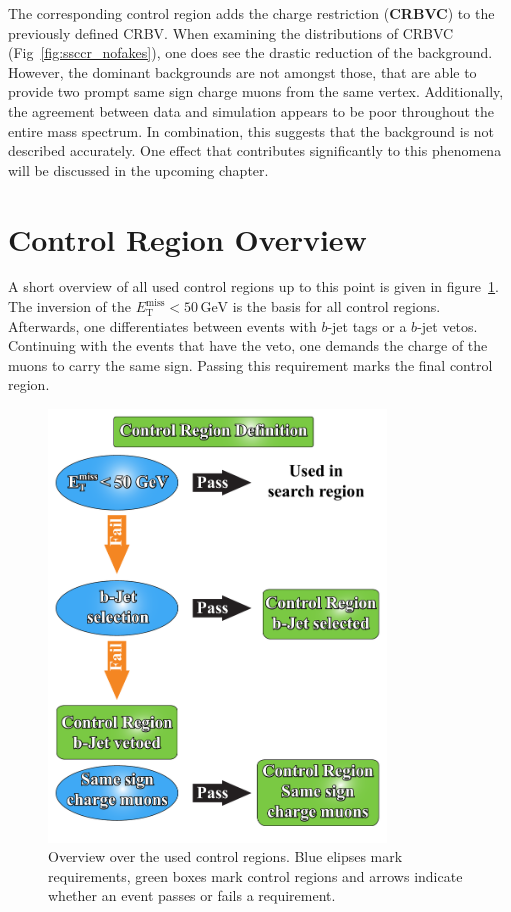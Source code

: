 The corresponding control region adds the charge restriction (\textbf{CRBVC}) to the previously defined CRBV. When examining the distributions of CRBVC (Fig~\ref{fig:ssccr_nofakes}), one does see the drastic reduction of the background. However, the dominant backgrounds are not amongst those, that are able to provide two prompt same sign charge muons from the same vertex. Additionally, the agreement between data and simulation appears to be poor throughout the entire mass spectrum. In combination, this suggests that the background is not described accurately. One effect that contributes significantly to this phenomena will be discussed in the upcoming chapter.

\section{Control Region Overview}
\label{sec:cr-overview}

A short overview of all used control regions up to this point is given in figure~\ref{fig:cr-overview}. The inversion of the $E^{\text{miss}}_{\text{T}} < 50\,\text{GeV}$ is the basis for all control regions. Afterwards, one differentiates between events with $b$-jet tags or a $b$-jet vetos. Continuing with the events that have the veto, one demands the charge of the muons to carry the same sign. Passing this requirement marks the final control region.

\begin{figure}[!h]
  \centering
  \includegraphics[width=0.8\textwidth]{plots/cr-overview.pdf}
  \caption{Overview over the used control regions. Blue elipses mark requirements, green boxes mark control regions and arrows indicate whether an event passes or fails a requirement.}
  \label{fig:cr-overview}
\end{figure}


